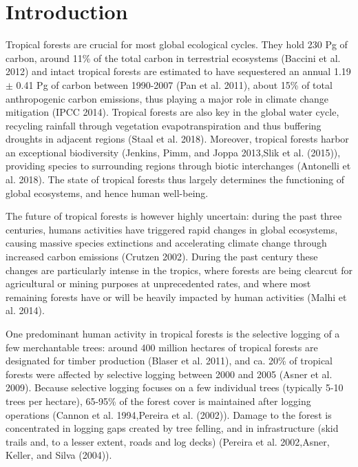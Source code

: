 \documentclass[]{elsarticle} %
\begin{document}
\section{Introduction}\label{introduction}

Tropical forests are crucial for most global ecological cycles. They
hold 230 Pg of carbon, around 11\% of the total carbon in terrestrial
ecosystems (Baccini et al. 2012) and intact tropical forests are
estimated to have sequestered an annual 1.19 \(\pm\) 0.41 Pg of carbon
between 1990-2007 (Pan et al. 2011), about 15\% of total anthropogenic
carbon emissions, thus playing a major role in climate change mitigation
(IPCC 2014). Tropical forests are also key in the global water cycle,
recycling rainfall through vegetation evapotranspiration and thus
buffering droughts in adjacent regions (Staal et al. 2018). Moreover,
tropical forests harbor an exceptional biodiversity (Jenkins, Pimm, and
Joppa 2013,Slik et al. (2015)), providing species to surrounding regions
through biotic interchanges (Antonelli et al. 2018). The state of
tropical forests thus largely determines the functioning of global
ecosystems, and hence human well-being.

The future of tropical forests is however highly uncertain: during the
past three centuries, humans activities have triggered rapid changes in
global ecosystems, causing massive species extinctions and accelerating
climate change through increased carbon emissions (Crutzen 2002). During
the past century these changes are particularly intense in the tropics,
where forests are being clearcut for agricultural or mining purposes at
unprecedented rates, and where most remaining forests have or will be
heavily impacted by human activities (Malhi et al. 2014).

One predominant human activity in tropical forests is the selective
logging of a few merchantable trees: around 400 million hectares of
tropical forests are designated for timber production (Blaser et al.
2011), and ca. 20\% of tropical forests were affected by selective
logging between 2000 and 2005 (Asner et al. 2009). Because selective
logging focuses on a few individual trees (typically 5-10 trees per
hectare), 65-95\% of the forest cover is maintained after logging
operations (Cannon et al. 1994,Pereira et al. (2002)). Damage to the
forest is concentrated in logging gaps created by tree felling, and in
infrastructure (skid trails and, to a lesser extent, roads and log
decks) (Pereira et al. 2002,Asner, Keller, and Silva (2004)).
\end{document}
